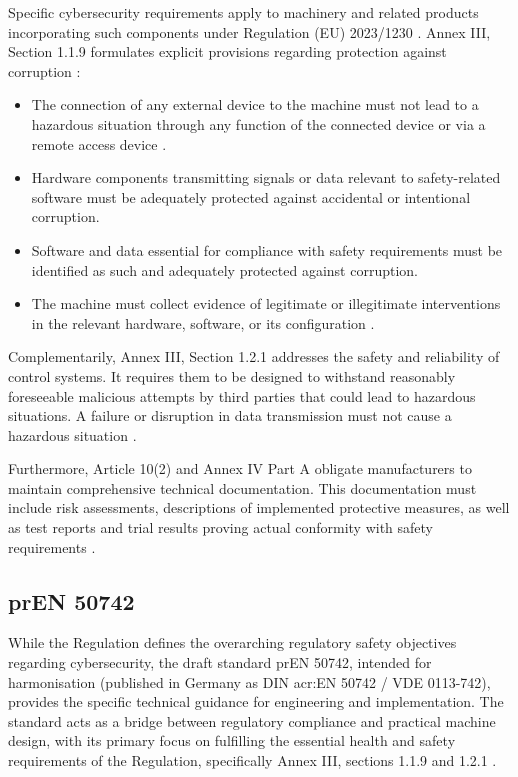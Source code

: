 Specific cybersecurity requirements apply to machinery and related products incorporating such components under Regulation (EU) 2023/1230 \cite[p. 44]{EU2023_1230}. Annex III, Section 1.1.9 formulates explicit provisions regarding protection against corruption \cite[pp. 47]{EU2023_1230}:
\begin{itemize}
	\item The connection of any external device to the machine must not lead to a hazardous situation through any function of the connected device or via a remote access device \cite[p. 48]{EU2023_1230}.
	\item Hardware components transmitting signals or data relevant to safety-related software must be adequately protected against accidental or intentional corruption.
	\item Software and data essential for compliance with safety requirements must be identified as such and adequately protected against corruption.
	\item The machine must collect evidence of legitimate or illegitimate interventions in the relevant hardware, software, or its configuration \cite[p. 49]{EU2023_1230}.
\end{itemize}

Complementarily, Annex III, Section 1.2.1 addresses the safety and reliability of control systems. It requires them to be designed to withstand reasonably foreseeable malicious attempts by third parties that could lead to hazardous situations. A failure or disruption in data transmission must not cause a hazardous situation \cite[p. 49]{EU2023_1230}.

Furthermore, Article 10(2) \cite[p. 18]{EU2023_1230} and Annex IV Part A \cite[pp. 83]{EU2023_1230} obligate manufacturers to maintain comprehensive technical documentation. This documentation must include risk assessments, descriptions of implemented protective measures, as well as test reports and trial results proving actual conformity with safety requirements \cite[p. 83]{EU2023_1230}. 


\subsection{prEN 50742} 
\label{subsec:pren_50742} 

While the Regulation defines the overarching regulatory safety objectives regarding cybersecurity, the draft standard prEN 50742, intended for harmonisation (published in Germany as DIN \gls{acr:EN} 50742 / VDE 0113-742), provides the specific technical guidance for engineering and implementation. The standard acts as a bridge between regulatory compliance and practical machine design, with its primary focus on fulfilling the essential health and safety requirements of the Regulation, specifically Annex III, sections 1.1.9 and 1.2.1 \cite[p. 70]{prEN50742_2025}. 

